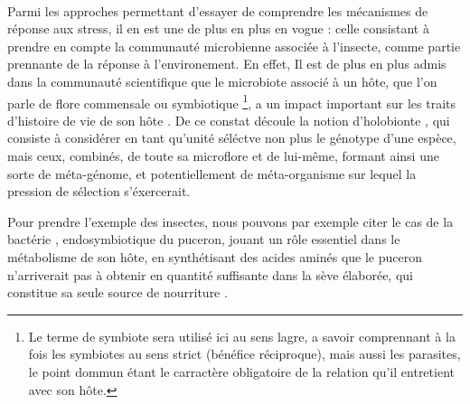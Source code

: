 
\paragraph{} %
\label{par:intro2}

Parmi les approches permettant d'essayer de comprendre les mécanismes de réponse aux stress, il en est une de plus en plus en vogue : celle consistant à prendre en compte la communauté microbienne associée à l'insecte, comme partie prennante de la réponse à l'environement.
En effet, Il est de plus en plus admis dans la communauté scientifique que le microbiote associé à un hôte, que l'on parle de flore commensale ou symbiotique%
\footnote{Le terme de symbiote sera utilisé ici au sens lagre, a savoir comprennant à la fois les symbiotes au sens strict (bénéfice réciproque), mais aussi les parasites, le point dommun étant le carractère obligatoire de la relation qu'il entretient avec son hôte.},
a un impact important sur les traits d'histoire de vie de son hôte \cite{feldhaar2011}.
De ce constat découle la notion d'holobionte \cite{rosenberg2007}, qui consiste à considérer en tant qu'unité séléctve non plus le génotype d'une espèce, mais ceux, combinés, de toute sa microflore et de lui-même, formant ainsi une sorte de méta-génome, et potentiellement de méta-organisme sur lequel la pression de sélection s'éxercerait.

Pour prendre l'exemple des insectes, nous pouvons par exemple citer le cas de la bactérie ,  endosymbiotique du puceron, jouant un rôle essentiel dans le métabolisme de son hôte,  en synthétisant des acides aminés que le puceron n'arriverait pas à obtenir en quantité suffisante dans la sève élaborée, qui constitue sa seule source de nourriture \cite{douglas1998}.


%



